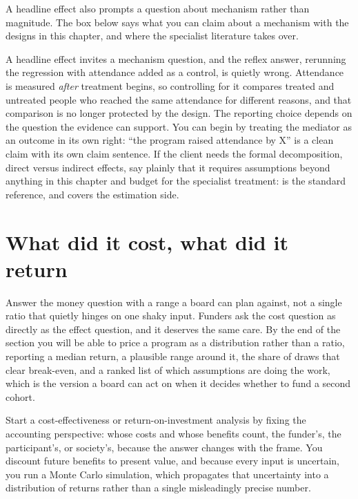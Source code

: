 A headline effect also prompts a question about mechanism rather than magnitude. The box below says what you can claim about a mechanism with the designs in this chapter, and where the specialist literature takes over.

\begin{kaobox}[frametitle=When the next question is \enquote{did it work \emph{through} attendance?}]
A headline effect invites a mechanism question, and the reflex answer, rerunning the regression with attendance added as a control, is quietly wrong. Attendance is measured \emph{after} treatment begins, so controlling for it compares treated and untreated people who reached the same attendance for different reasons, and that comparison is no longer protected by the design. The reporting choice depends on the question the evidence can support. You can begin by treating the mediator as an outcome in its own right: \enquote{the program raised attendance by X} is a clean claim with its own claim sentence. If the client needs the formal decomposition, direct versus indirect effects, say plainly that it requires assumptions beyond anything in this chapter and budget for the specialist treatment: \textcite{vanderweele2015explanation} is the standard reference, and \textcite{huber2023causal} covers the estimation side.
\end{kaobox}

\section{What did it cost, what did it return}\label{sec:roi}
Answer the money question with a range a board can plan against, not a single ratio that quietly hinges on one shaky input. Funders ask the cost question as directly as the effect question, and it deserves the same care. By the end of the section you will be able to price a program as a distribution rather than a ratio, reporting a median return, a plausible range around it, the share of draws that clear break-even, and a ranked list of which assumptions are doing the work, which is the version a board can act on when it decides whether to fund a second cohort.

Start a cost-effectiveness or return-on-investment analysis by fixing the accounting perspective: whose costs and whose benefits count, the funder's, the participant's, or society's, because the answer changes with the frame. You discount future benefits to present value, and because every input is uncertain, you run a Monte Carlo simulation, which propagates that uncertainty into a distribution of returns rather than a single misleadingly precise number.

